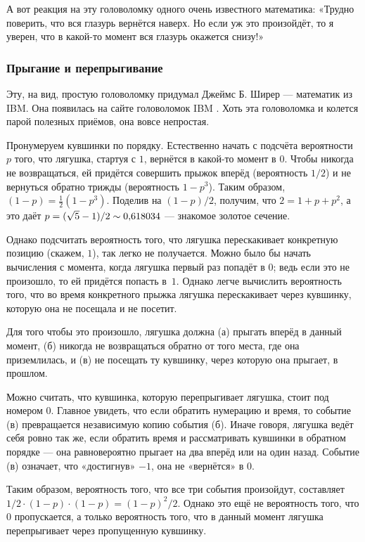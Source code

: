 А вот реакция на эту головоломку одного очень известного математика:
«Трудно поверить, что вся глазурь вернётся наверх.
Но если уж это произойдёт, то я уверен, что в какой-то момент вся глазурь окажется снизу!»

\subsubsection*{Прыгание и перепрыгивание}

Эту, на вид, простую головоломку придумал Джеймс Б. Ширер --- математик из IBM.
Она появилась на сайте головоломок IBM \cite[апрель 2007]{ponder-this}.
Хоть эта головоломка и колется парой полезных приёмов, она вовсе непростая.

Пронумеруем кувшинки по порядку.
Естественно начать с подсчёта вероятности $p$ того, что лягушка, стартуя с $1$, вернётся в какой-то момент в $0$.
Чтобы никогда не возвращаться, ей придётся совершить прыжок вперёд (вероятность $1/2$) и не вернуться обратно трижды (вероятность $1 - p^3$).
Таким образом, $(1 - p) = \tfrac12(1 - p^3)$.
Поделив на $(1 - p)/2$, получим, что $2 = 1 + p + p^2$, а это даёт $p = (\sqrt5 - 1)/2 \z\sim 0{,}618034$ --- знакомое золотое сечение.

Однако подсчитать вероятность того, что лягушка перескакивает конкретную позицию (скажем, $1$), так легко не получается.
Можно было бы начать вычисления с момента, когда лягушка первый раз попадёт в $0$; ведь если это не произошло, то ей придётся попасть в~$1$.
Однако легче вычислить вероятность того, что во время конкретного прыжка лягушка перескакивает через кувшинку, которую она  не посещала и не посетит.

Для того чтобы это произошло, лягушка должна
(а) прыгать вперёд в данный момент,
(б) никогда не возвращаться обратно от того места, где она приземлилась,
и (в) не посещать ту кувшинку, через которую она прыгает, в прошлом.

Можно считать, что кувшинка, которую перепрыгивает лягушка, стоит под номером 0.
Главное увидеть, что если обратить нумерацию и время, то событие (в) превращается независимую копию события (б).
Иначе говоря, лягушка ведёт себя ровно так же, если обратить время и рассматривать кувшинки в обратном порядке ---
она равновероятно прыгает на два вперёд или на один назад.
Событие (в) означает, что «достигнув» $-1$, она не «вернётся» в $0$.

Таким образом, вероятность того, что все три события произойдут, составляет $1/2 \cdot (1 - p) \cdot (1 - p) = (1 - p)^2 / 2$.
Однако это ещё не вероятность того, что $0$ пропускается, а только вероятность того, что в данный момент лягушка перепрыгивает через пропущенную кувшинку.

